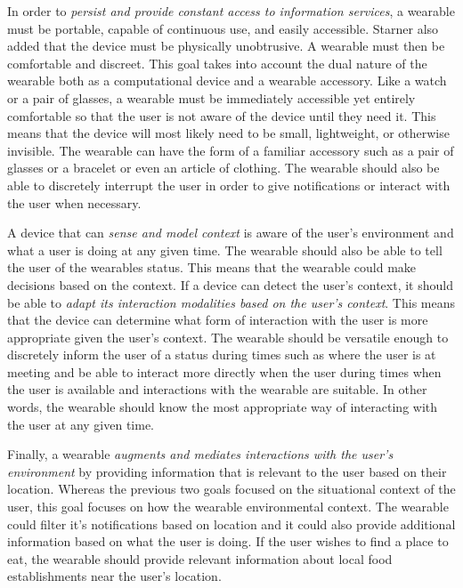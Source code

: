 \documentclass[11pt]{article}
\begin{document}
In order to \textit{persist and provide constant access to information services}, a wearable must be portable, capable of continuous use, and easily accessible. Starner also added that the device must be physically unobtrusive. A wearable must then be comfortable and discreet. This goal takes into account the dual nature of the wearable both as a computational device and a wearable accessory. Like a watch or a pair of glasses, a wearable must be immediately accessible yet entirely comfortable so that the user is not aware of the device until they need it.  This means that the device will most likely need to be small, lightweight, or otherwise invisible. The wearable can have the form of a familiar accessory such as a pair of glasses or a bracelet or even an article of clothing. The wearable should also be able to discretely interrupt the user in order to give notifications or interact with the user when necessary.

A device that can \textit{sense and model context} is aware of the user's environment and what a user is doing at any given time. The wearable should also be able to tell the user of the wearables status. This means that the wearable could make decisions based on the context. If a device can detect the user's context, it should be able to \textit{adapt its interaction modalities based on the user's context}. This means that the device can determine what form of interaction with the user is more appropriate given the user's context. The wearable should be versatile enough to discretely inform the user of a status during times such as where the user is at meeting and be able to interact more directly when the user during times when the user is available and interactions with the wearable are suitable. In other words, the wearable should know the most appropriate way of interacting with the user at any given time.

Finally, a wearable \textit{augments and mediates interactions with the user's environment} by providing information that is relevant to the user based on their location. Whereas the previous two goals focused on the situational context of the user, this goal focuses on how the wearable environmental context. The wearable could filter it's notifications based on location and it could also provide additional information based on what the user is doing. If the user wishes to find a place to eat, the wearable should provide relevant information about local food establishments near the user's location. 
\end{document}
